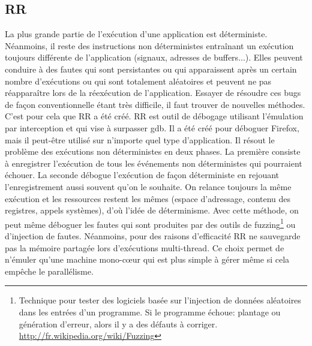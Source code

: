 \subsection{RR}
\label{subsection:RR}

La plus grande partie de l'exécution d'une application est
déterministe. Néanmoins, il reste des instructions non déterministes entraînant
un exécution toujours différente de l'application (signaux, adresses de
buffers...). Elles peuvent conduire à des fautes qui sont persistantes ou qui
apparaissent après un certain nombre d'exécutions ou qui sont totalement
aléatoires et peuvent ne pas réapparaître lors de la réexécution de
l'application. Essayer de résoudre ces bugs de façon conventionnelle étant très
difficile, il faut trouver de nouvelles méthodes. C'est pour cela que RR a été
créé. RR \citep{RR} est outil de débogage utilisant l'émulation par interception
et qui vise à surpasser gdb. Il a été créé pour déboguer Firefox, mais il
peut-être utilisé sur n'importe quel type d'application. Il résout le problème
des exécutions non déterministes en deux phases. La première consiste à
enregistrer l'exécution de tous les événements non déterministes qui pourraient
échouer. La seconde débogue l'exécution de façon déterministe en rejouant
l'enregistrement aussi souvent qu'on le souhaite. On relance toujours la même
exécution et les ressources restent les mêmes (espace d'adressage, contenu
des registres, appels systèmes), d'où l'idée de déterminisme. Avec cette
méthode, on peut même déboguer les fautes qui sont produites par des outils de
fuzzing\footnote{ Technique pour tester des logiciels basée sur l'injection de
  données aléatoires dans les entrées d'un programme. Si le programme échoue:
  plantage ou génération d'erreur, alors il y a des défauts à
  corriger. \\ \url{http://fr.wikipedia.org/wiki/Fuzzing}} ou d'injection de
fautes. Néanmoins, pour des raisons d'efficacité RR ne sauvegarde pas la mémoire
partagée lors d'exécutions multi-thread. Ce choix permet de n'émuler qu'une
machine mono-c\oe ur qui est plus simple à gérer même si cela empêche le
parallélisme.

